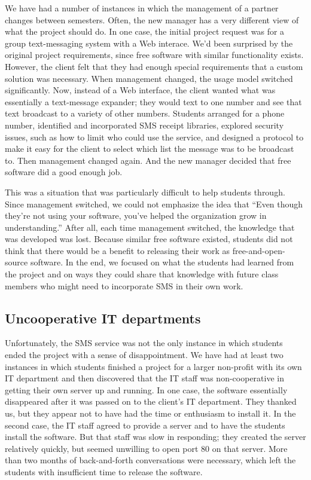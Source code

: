 We have had a number of instances in which the management of a
partner changes between semesters.  Often, the new manager has a
very different view of what the project should do.  In one case,
the initial project request was for a group text-messaging system
with a Web interace.  We'd been surprised by the original project
requirements, since free software with similar functionality exists.
However, the client felt that they had enough special requirements
that a custom solution was necessary.  When management changed, the
usage model switched significantly.  Now, instead of a Web interface,
the client wanted what was essentially a text-message expander;
they would text to one number and see that text broadcast to a
variety of other numbers.  Students arranged for a phone number,
identified and incorporated SMS receipt libraries, explored security
issues, such as how to limit who could use the service, and designed
a protocol to make it easy for the client to select which list the
message was to be broadcast to.  Then management changed again.  And
the new manager decided that free software did a good enough job.

This was a situation that was particularly difficult to help students
through.  Since management switched, we could not emphasize the idea
that ``Even though they're not using your software, you've helped the
organization grow in understanding.'' After all, each time management 
switched, the knowledge that was developed was lost.   Because similar
free software existed, students did not think that there would be
a benefit to releasing their work as free-and-open-source software.
In the end, we focused on what the students had learned from the project
and on ways they could share that knowledge with future class members
who might need to incorporate SMS in their own work.

\subsection{Uncooperative IT departments}

Unfortunately, the SMS service was not the only instance in which
students ended the project with a sense of disappointment.  We have
had at least two instances in which students finished a project for
a larger non-profit with its own IT department and then discovered that
the IT staff was non-cooperative in getting their own server up and
running.  In one case, the software essentially disappeared after
it was passed on to the client's IT department.  They thanked us,
but they appear not to have had the time or enthusiasm to install
it.  In the second case, the IT staff agreed to provide a server
and to have the students install the software.  But that staff was
slow in responding; they created the server relatively quickly, but
seemed unwilling to open port 80 on that server.  More than two
months of back-and-forth conversations were necessary, which left
the students with insufficient time to release the software.

